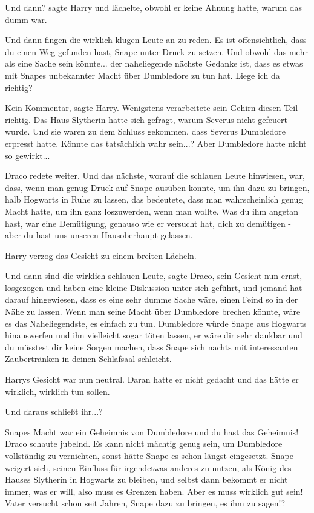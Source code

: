 \glqq{}Und dann?\grqq{} sagte Harry und lächelte, obwohl er keine Ahnung hatte,
warum das dumm war.

\glqq{}Und dann fingen die wirklich klugen Leute an zu reden. Es ist
offensichtlich, dass du einen Weg gefunden hast, Snape unter Druck zu setzen.
Und obwohl das mehr als eine Sache sein könnte... der naheliegende nächste
Gedanke ist, dass es etwas mit Snapes unbekannter Macht über Dumbledore zu tun
hat. Liege ich da richtig?\grqq{}

\glqq{}Kein Kommentar\grqq{}, sagte Harry. Wenigstens verarbeitete sein Gehirn
diesen Teil richtig. Das Haus Slytherin hatte sich gefragt, warum Severus nicht
gefeuert wurde. Und sie waren zu dem Schluss gekommen, dass Severus Dumbledore
erpresst hatte. Könnte das tatsächlich wahr sein...? Aber Dumbledore hatte nicht
so gewirkt...

Draco redete weiter. \glqq{}Und das nächste, worauf die schlauen Leute hinwiesen,
war, dass, wenn man genug Druck auf Snape ausüben konnte, um ihn dazu zu
bringen, halb Hogwarts in Ruhe zu lassen, das bedeutete, dass man wahrscheinlich
genug Macht hatte, um ihn ganz loszuwerden, wenn man wollte. Was du ihm angetan
hast, war eine Demütigung, genauso wie er versucht hat, dich zu demütigen - aber
du hast uns unseren Hausoberhaupt gelassen.\grqq{}

Harry verzog das Gesicht zu einem breiten Lächeln.

\glqq{}Und dann sind die wirklich schlauen Leute\grqq{}, sagte Draco, sein
Gesicht nun ernst, \glqq{}losgezogen und haben eine kleine Diskussion unter sich
geführt, und jemand hat darauf hingewiesen, dass es eine sehr dumme Sache wäre,
einen Feind so in der Nähe zu lassen. Wenn man seine Macht über Dumbledore
brechen könnte, wäre es das Naheliegendste, es einfach zu tun. Dumbledore würde
Snape aus Hogwarts hinauswerfen und ihn vielleicht sogar töten lassen, er wäre
dir sehr dankbar und du müsstest dir keine Sorgen machen, dass Snape sich nachts
mit interessanten Zaubertränken in deinen Schlafsaal schleicht.\grqq{}

Harrys Gesicht war nun neutral. Daran hatte er nicht gedacht und das hätte er
wirklich, wirklich tun sollen.

\glqq{}Und daraus schließt ihr...?\grqq{}

\glqq{}Snapes Macht war ein Geheimnis von Dumbledore und du hast das
Geheimnis!\grqq{} Draco schaute jubelnd. \glqq{}Es kann nicht mächtig genug sein,
um Dumbledore vollständig zu vernichten, sonst hätte Snape es schon längst
eingesetzt. Snape weigert sich, seinen Einfluss für irgendetwas anderes zu
nutzen, als König des Hauses Slytherin in Hogwarts zu bleiben, und selbst dann
bekommt er nicht immer, was er will, also muss es Grenzen haben. Aber es muss
wirklich gut sein! Vater versucht schon seit Jahren, Snape dazu zu bringen, es
ihm zu sagen!?\grqq{}

